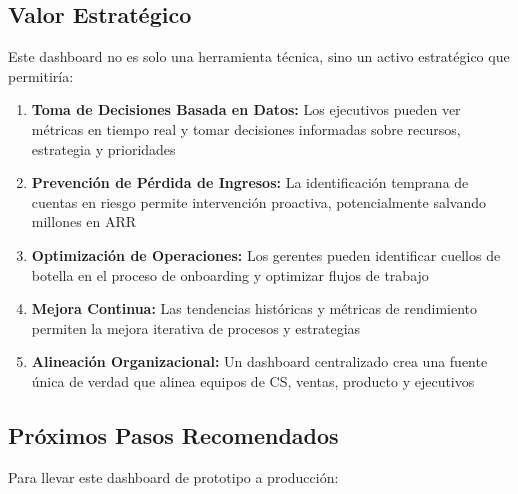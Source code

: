 \documentclass[12pt,a4paper]{article}
\begin{document}
\subsection{Valor Estratégico}

Este dashboard no es solo una herramienta técnica, sino un activo estratégico que permitiría:

\begin{enumerate}
    \item \textbf{Toma de Decisiones Basada en Datos:} Los ejecutivos pueden ver métricas en tiempo real y tomar decisiones informadas sobre recursos, estrategia y prioridades

    \item \textbf{Prevención de Pérdida de Ingresos:} La identificación temprana de cuentas en riesgo permite intervención proactiva, potencialmente salvando millones en ARR

    \item \textbf{Optimización de Operaciones:} Los gerentes pueden identificar cuellos de botella en el proceso de onboarding y optimizar flujos de trabajo

    \item \textbf{Mejora Continua:} Las tendencias históricas y métricas de rendimiento permiten la mejora iterativa de procesos y estrategias

    \item \textbf{Alineación Organizacional:} Un dashboard centralizado crea una fuente única de verdad que alinea equipos de CS, ventas, producto y ejecutivos
\end{enumerate}

\subsection{Próximos Pasos Recomendados}

Para llevar este dashboard de prototipo a producción:
\end{document}
